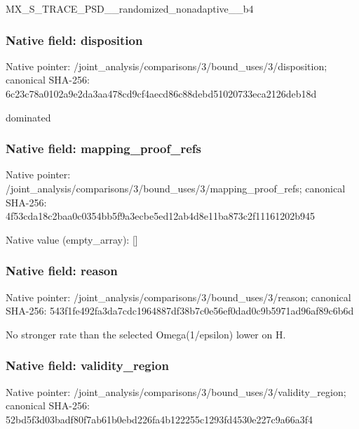\documentclass[10pt,a4paper]{article}
\begin{document}
\begingroup\raggedright\sloppy MX\_\allowbreak{}S\_\allowbreak{}TRACE\_\allowbreak{}PSD\_\allowbreak{}\_\allowbreak{}randomized\_\allowbreak{}nonadaptive\_\allowbreak{}\_\allowbreak{}b4\par\endgroup

\subsubsection{Native field: disposition}
Native pointer: /joint\_\allowbreak{}analysis/comparisons/3/bound\_\allowbreak{}uses/3/disposition; canonical SHA-256: 6c23c78a0102a9e2da3aa478cd9cf4aecd86c88debd51020733eca2126deb18d

\begingroup\raggedright\sloppy dominated\par\endgroup

\subsubsection{Native field: mapping\_\allowbreak{}proof\_\allowbreak{}refs}
Native pointer: /joint\_\allowbreak{}analysis/comparisons/3/bound\_\allowbreak{}uses/3/mapping\_\allowbreak{}proof\_\allowbreak{}refs; canonical SHA-256: 4f53cda18c2baa0c0354bb5f9a3ecbe5ed12ab4d8e11ba873c2f11161202b945

Native value (empty\_\allowbreak{}array): []

\subsubsection{Native field: reason}
Native pointer: /joint\_\allowbreak{}analysis/comparisons/3/bound\_\allowbreak{}uses/3/reason; canonical SHA-256: 543f1fe492fa3da7cdc1964887df38b7c0e56ef0dad0c9b5971ad96af89c6b6d

\begingroup\raggedright\sloppy No stronger rate than the selected Omega(1/\allowbreak{}epsilon) lower on H.\par\endgroup

\subsubsection{Native field: validity\_\allowbreak{}region}
Native pointer: /joint\_\allowbreak{}analysis/comparisons/3/bound\_\allowbreak{}uses/3/validity\_\allowbreak{}region; canonical SHA-256: 52bd5f3d03badf80f7ab61b0ebd226fa4b122255c1293fd4530e227c9a66a3f4
\end{document}
